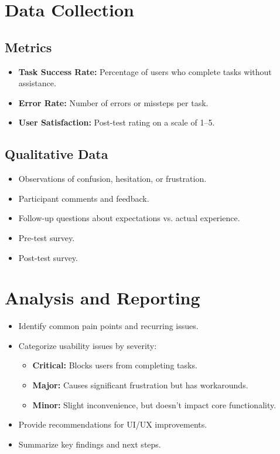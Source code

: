 \documentclass[12pt, titlepage]{article}
\begin{document}
\section*{Data Collection}
\subsection*{Metrics}
\begin{itemize}
    \item \textbf{Task Success Rate:} Percentage of users who complete tasks without assistance.
    \item \textbf{Error Rate:} Number of errors or missteps per task.
    \item \textbf{User Satisfaction:} Post-test rating on a scale of 1–5.
\end{itemize}

\subsection*{Qualitative Data}
\begin{itemize}
    \item Observations of confusion, hesitation, or frustration.
    \item Participant comments and feedback.
    \item Follow-up questions about expectations vs. actual experience.
    \item Pre-test survey.
    \item Post-test survey.
\end{itemize}

\section*{Analysis and Reporting}
\begin{itemize}
    \item Identify common pain points and recurring issues.
    \item Categorize usability issues by severity:
        \begin{itemize}
            \item \textbf{Critical:} Blocks users from completing tasks.
            \item \textbf{Major:} Causes significant frustration but has workarounds.
            \item \textbf{Minor:} Slight inconvenience, but doesn’t impact core functionality.
        \end{itemize}
    \item Provide recommendations for UI/UX improvements.
    \item Summarize key findings and next steps.
\end{itemize}
\end{document}

